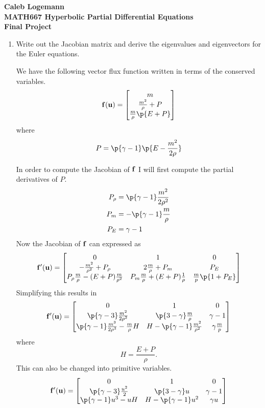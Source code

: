 \documentclass[11pt, oneside]{article}
\begin{document}
\noindent \textbf{\Large{Caleb Logemann \\
MATH667 Hyperbolic Partial Differential Equations \\
Final Project
}}

%
\begin{enumerate}
  \item %
    Write out the Jacobian matrix and derive the eigenvalues and eigenvectors
    for the Euler equations.

    We have the following vector flux function written in terms of the conserved variables.
    \[
      \v{f}(\v{u}) =
      \begin{bmatrix}
        m \\
        \frac{m^2}{\rho} + P \\
        \frac{m}{\rho}\p{E + P}
      \end{bmatrix}
    \]
    where
    \[
      P = \p{\gamma - 1}\p{E - \frac{m^2}{2\rho}}
    \]

    In order to compute the Jacobian of $\mathbf{f}$ I will first compute the partial derivatives of $P$.
    \begin{align*}
      P_{\rho} &= \p{\gamma - 1} \frac{m^2}{2 \rho^2} \\
      P_m &= -\p{\gamma - 1}\frac{m}{\rho} \\
      P_E &= \gamma - 1
    \end{align*}
    Now the Jacobian of $\mathbf{f}$ can expressed as
    \[
      \v{f}'(\v{u}) =
      \begin{bmatrix}
        0 & 1 & 0 \\
        -\frac{m^2}{\rho^2} + P_{\rho} & 2 \frac{m}{\rho} + P_m & P_E \\
        P_{\rho} \frac{m}{\rho} - (E + P)\frac{m}{\rho^2} & P_m \frac{m}{\rho} + (E + P) \frac{1}{\rho} & \frac{m}{p}\p{1 + P_E}
      \end{bmatrix}
    \]
    Simplifying this results in
    \[
      \v{f}'(\v{u}) =
      \begin{bmatrix}
        0 & 1 & 0 \\
        \p{\gamma - 3} \frac{m^2}{2 \rho^2} & \p{3 - \gamma}\frac{m}{\rho} & \gamma - 1 \\
        \p{\gamma - 1} \frac{m^3}{2 \rho^3} - \frac{m}{\rho} H & H - \p{\gamma - 1}\frac{m^2}{\rho^2}  & \gamma\frac{m}{p}
      \end{bmatrix}
    \]
    where
    \[
      H = \frac{E + P}{\rho}.
    \]
    This can also be changed into primitive variables.
    \[
      \v{f}'(\v{u}) =
      \begin{bmatrix}
        0 & 1 & 0 \\
        \p{\gamma - 3} \frac{u^2}{2} & \p{3 - \gamma}u & \gamma - 1 \\
        \p{\gamma - 1} u^3 - u H & H - \p{\gamma - 1}u^2  & \gamma u
      \end{bmatrix}
    \]


\end{enumerate}
\end{document}
